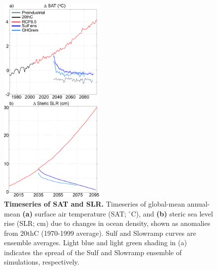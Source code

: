 \documentclass[grl]{AGUTeX}  %
\begin{document}
\begin{article}
\begin{figure}[htbp] %
\centering
 \noindent\includegraphics[width=12pc]{figures/SATSLRtimeseries2.pdf}
\caption{\textbf{Timeseries of SAT and SLR.} Timeseries of global-mean annual-mean \textbf{(a)} surface air temperature (SAT; $^\circ$C), and \textbf{(b)} steric sea level rise (SLR; cm) due to changes in ocean density, shown as anomalies from 20thC (1970-1999 average). Sulf and Slowramp curves are ensemble averages. Light blue and light green shading in (a) indicates the spread of the Sulf and Slowramp ensemble of simulations, respectively.}
\label{fig:gmts} %
\end{figure}



\end{article}
\end{document}
